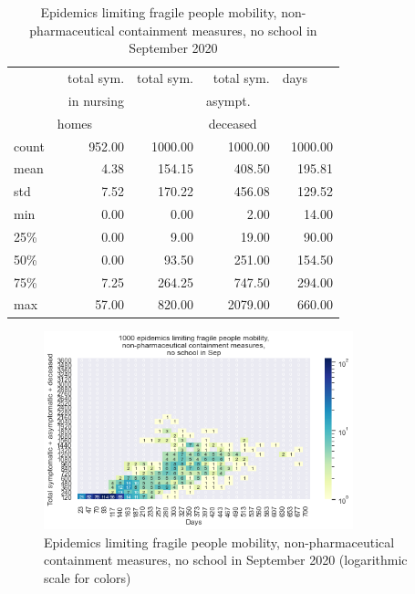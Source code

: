 \documentclass[11pt]{article}
\begin{document}
\begin{table}[H]
\center
\small
\begin{tabular}{lrrrr}
\toprule
{} & total sym.        &  total sym. & total sym.     & days~~~~ \\
{} & in nursing        &                  & asympt.~~~  & \\
{} & homes~~~~~  &                  & deceased~~ & \\
\midrule
count &     952.00 &             1000.00 &                 1000.00 & 1000.00 \\
mean  &       4.38 &              154.15 &                  408.50 &  195.81 \\
std   &       7.52 &              170.22 &                  456.08 &  129.52 \\
min   &       0.00 &                0.00 &                    2.00 &   14.00 \\
25\%   &       0.00 &                9.00 &                   19.00 &   90.00 \\
50\%   &       0.00 &               93.50 &                  251.00 &  154.50 \\
75\%   &       7.25 &              264.25 &                  747.50 &  294.00 \\
max   &      57.00 &              820.00 &                 2079.00 &  660.00 \\
\bottomrule
\end{tabular}

\label{EpidemicsFragileT}
\caption{Epidemics limiting fragile people mobility, non-pharmaceutical containment measures, no school in September 2020}
\end{table}


\begin{figure}[H]
\begin{center}
\includegraphics[width=0.8\textwidth]{HM30_readRunResults1k_with_Frag_at20_plusHMlog.png}
\caption{Epidemics limiting fragile people mobility, non-pharmaceutical containment measures, no school in September 2020 (logarithmic scale for colors)}
\label{EpidemicsFragileHM}
\end{center}
\end{figure}
\end{document}
